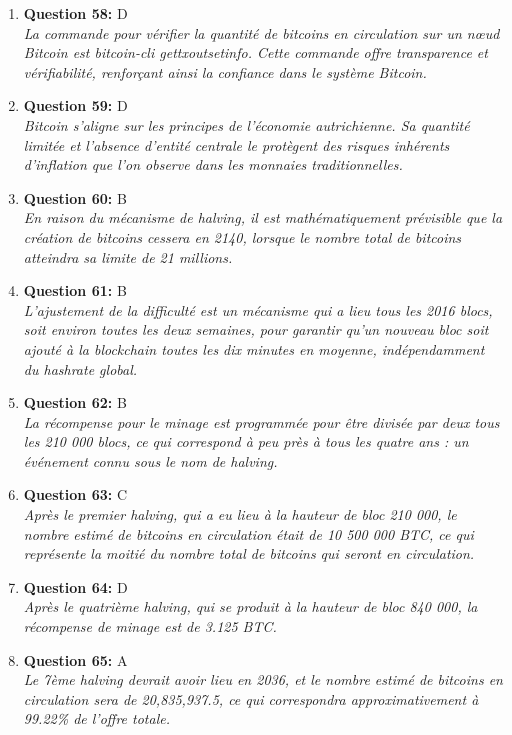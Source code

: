 \documentclass[12pt,a4paper]{article}
\begin{document}
\begin{enumerate}
\item \textbf{Question 58:} D
\\ \textit{La commande pour vérifier la quantité de bitcoins en circulation sur un nœud Bitcoin est bitcoin-cli gettxoutsetinfo. Cette commande offre transparence et vérifiabilité, renforçant ainsi la confiance dans le système Bitcoin.}

\item \textbf{Question 59:} D
\\ \textit{Bitcoin s'aligne sur les principes de l'économie autrichienne. Sa quantité limitée et l'absence d'entité centrale le protègent des risques inhérents d'inflation que l'on observe dans les monnaies traditionnelles.}

\item \textbf{Question 60:} B
\\ \textit{En raison du mécanisme de halving, il est mathématiquement prévisible que la création de bitcoins cessera en 2140, lorsque le nombre total de bitcoins atteindra sa limite de 21 millions.}

\item \textbf{Question 61:} B
\\ \textit{L'ajustement de la difficulté est un mécanisme qui a lieu tous les 2016 blocs, soit environ toutes les deux semaines, pour garantir qu'un nouveau bloc soit ajouté à la blockchain toutes les dix minutes en moyenne, indépendamment du hashrate global.}

\item \textbf{Question 62:} B
\\ \textit{La récompense pour le minage est programmée pour être divisée par deux tous les 210 000 blocs, ce qui correspond à peu près à tous les quatre ans : un événement connu sous le nom de halving.}

\item \textbf{Question 63:} C
\\ \textit{Après le premier halving, qui a eu lieu à la hauteur de bloc 210 000, le nombre estimé de bitcoins en circulation était de 10 500 000 BTC, ce qui représente la moitié du nombre total de bitcoins qui seront en circulation.}

\item \textbf{Question 64:} D
\\ \textit{Après le quatrième halving, qui se produit à la hauteur de bloc 840 000, la récompense de minage est de 3.125 BTC.}

\item \textbf{Question 65:} A
\\ \textit{Le 7ème halving devrait avoir lieu en 2036, et le nombre estimé de bitcoins en circulation sera de 20,835,937.5, ce qui correspondra approximativement à 99.22\% de l'offre totale.}


\end{enumerate}
\end{document}
